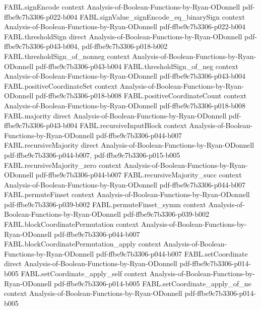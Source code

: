 \begin{theorem}
\proofstep
  {FABL.signEncode}
  {context}
  {Analysis-of-Boolean-Functions-by-Ryan-ODonnell}
  {pdf-ffbe9c7b3306-p022-b004}
\proofstep
  {FABL.signValue_signEncode_eq_binarySign}
  {context}
  {Analysis-of-Boolean-Functions-by-Ryan-ODonnell}
  {pdf-ffbe9c7b3306-p022-b004}
\proofstep
  {FABL.thresholdSign}
  {direct}
  {Analysis-of-Boolean-Functions-by-Ryan-ODonnell}
  {pdf-ffbe9c7b3306-p043-b004,
    pdf-ffbe9c7b3306-p018-b002}
\proofstep
  {FABL.thresholdSign_of_nonneg}
  {context}
  {Analysis-of-Boolean-Functions-by-Ryan-ODonnell}
  {pdf-ffbe9c7b3306-p043-b004}
\proofstep
  {FABL.thresholdSign_of_neg}
  {context}
  {Analysis-of-Boolean-Functions-by-Ryan-ODonnell}
  {pdf-ffbe9c7b3306-p043-b004}
\proofstep
  {FABL.positiveCoordinateSet}
  {context}
  {Analysis-of-Boolean-Functions-by-Ryan-ODonnell}
  {pdf-ffbe9c7b3306-p018-b008}
\proofstep
  {FABL.positiveCoordinateCount}
  {context}
  {Analysis-of-Boolean-Functions-by-Ryan-ODonnell}
  {pdf-ffbe9c7b3306-p018-b008}
\proofstep
  {FABL.majority}
  {direct}
  {Analysis-of-Boolean-Functions-by-Ryan-ODonnell}
  {pdf-ffbe9c7b3306-p043-b004}
\proofstep
  {FABL.recursiveInputBlock}
  {context}
  {Analysis-of-Boolean-Functions-by-Ryan-ODonnell}
  {pdf-ffbe9c7b3306-p044-b007}
\proofstep
  {FABL.recursiveMajority}
  {direct}
  {Analysis-of-Boolean-Functions-by-Ryan-ODonnell}
  {pdf-ffbe9c7b3306-p044-b007,
    pdf-ffbe9c7b3306-p015-b005}
\proofstep
  {FABL.recursiveMajority_zero}
  {context}
  {Analysis-of-Boolean-Functions-by-Ryan-ODonnell}
  {pdf-ffbe9c7b3306-p044-b007}
\proofstep
  {FABL.recursiveMajority_succ}
  {context}
  {Analysis-of-Boolean-Functions-by-Ryan-ODonnell}
  {pdf-ffbe9c7b3306-p044-b007}
\proofstep
  {FABL.permuteFinset}
  {context}
  {Analysis-of-Boolean-Functions-by-Ryan-ODonnell}
  {pdf-ffbe9c7b3306-p039-b002}
\proofstep
  {FABL.permuteFinset_symm}
  {context}
  {Analysis-of-Boolean-Functions-by-Ryan-ODonnell}
  {pdf-ffbe9c7b3306-p039-b002}
\proofstep
  {FABL.blockCoordinatePermutation}
  {context}
  {Analysis-of-Boolean-Functions-by-Ryan-ODonnell}
  {pdf-ffbe9c7b3306-p044-b007}
\proofstep
  {FABL.blockCoordinatePermutation_apply}
  {context}
  {Analysis-of-Boolean-Functions-by-Ryan-ODonnell}
  {pdf-ffbe9c7b3306-p044-b007}
\proofstep
  {FABL.setCoordinate}
  {direct}
  {Analysis-of-Boolean-Functions-by-Ryan-ODonnell}
  {pdf-ffbe9c7b3306-p014-b005}
\proofstep
  {FABL.setCoordinate_apply_self}
  {context}
  {Analysis-of-Boolean-Functions-by-Ryan-ODonnell}
  {pdf-ffbe9c7b3306-p014-b005}
\proofstep
  {FABL.setCoordinate_apply_of_ne}
  {context}
  {Analysis-of-Boolean-Functions-by-Ryan-ODonnell}
  {pdf-ffbe9c7b3306-p014-b005}

\end{theorem}
